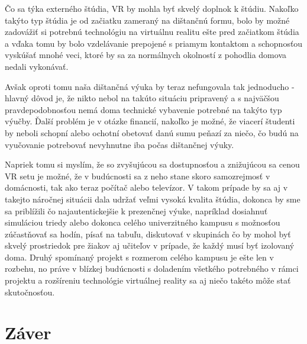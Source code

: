 \documentclass[10pt,twoside,slovak,a4paper]{article}
\begin{document}
Čo sa týka externého štúdia, VR by mohla byť skvelý doplnok k štúdiu. Nakoľko takýto typ štúdia je od začiatku zameraný na dištančnú formu, bolo by možné zadovážiť si potrebnú technológiu na virtuálnu realitu ešte pred začiatkom štúdia a vďaka tomu by bolo vzdelávanie prepojené s priamym kontaktom a schopnosťou vyskúšať mnohé veci, ktoré by sa za normálnych okolností z pohodlia domova nedali vykonávať.

Avšak oproti tomu naša dištančná výuka by teraz nefungovala tak jednoducho - hlavný dôvod je, že nikto nebol na takúto situáciu pripravený a s najväčšou pravdepodobnosťou nemá doma technické vybavenie potrebné na takýto typ výučby. Ďalší problém je v otázke financií, nakoľko je možné, že viacerí študenti by neboli schopní alebo ochotní obetovať danú sumu peňazí za niečo, čo budú na vyučovanie potrebovať nevyhnutne iba počas dištančnej výuky. 

Napriek tomu si myslím, že so zvyšujúcou sa dostupnosťou a znižujúcou sa cenou VR setu je možné, že v budúcnosti sa z neho stane skoro samozrejmosť v domácnosti, tak ako teraz počítač alebo televízor. V takom prípade by sa aj v takejto náročnej situácii dala udržať veľmi vysoká kvalita štúdia, dokonca by sme sa priblížili čo najautentickejšie k prezenčnej výuke, napríklad dosiahnuť simuláciou triedy \cite{trieda} alebo dokonca celého univerzitného kampusu \cite{distancne} s možnosťou zúčastňovať sa hodín, písať na tabuľu, diskutovať v skupinách čo by mohol byť skvelý prostriedok pre žiakov aj učiteľov v prípade, že každý musí byť izolovaný doma. Druhý spomínaný projekt s rozmerom celého kampusu je ešte len v rozbehu, no práve v blízkej budúcnosti s doladením všetkého potrebného v rámci projektu a rozšíreniu technológie virtuálnej reality sa aj niečo takéto môže stať skutočnosťou.

\section{Záver} \label{zaver} 








\end{document}
